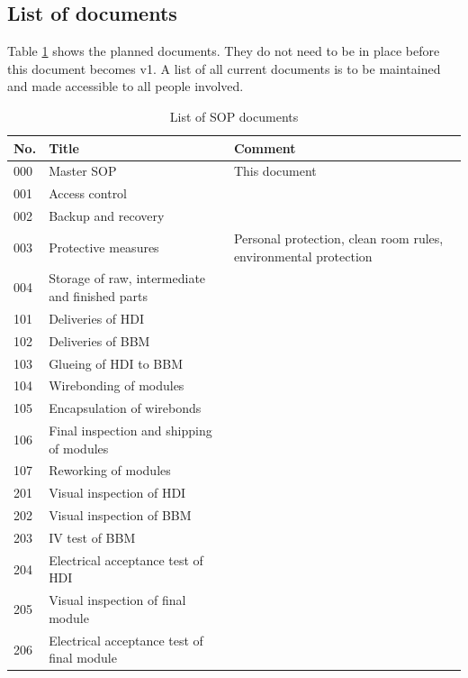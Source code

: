 \documentclass[12pt]{unlsilabsop}
\begin{document}
\subsection{List of documents}
Table \ref{tbl:SOPlist} shows the planned documents. They do not need to be in place before this document becomes v1. A list of all current documents is to be maintained and made accessible to all people involved.

\begin{table}[hH]
\begin{center}
\caption{List of SOP documents}
\label{tbl:SOPlist}

\bigskip

{\footnotesize
\begin{tabular}{lp{7cm}p{6cm}}
\toprule
No. & Title & Comment \\
\midrule
000 & Master SOP & This document \\
\midrule
001 & Access control & \\
002 & Backup and recovery & \\
003 & Protective measures & Personal protection, clean room rules, environmental protection \\
004 & Storage of raw, intermediate and finished parts & \\
\midrule
101 & Deliveries of HDI & \\
102 & Deliveries of BBM & \\
103 & Glueing of HDI to BBM & \\
104 & Wirebonding of modules & \\
105 & Encapsulation of wirebonds & \\
106 & Final inspection and shipping of modules & \\
107 & Reworking of modules & \\
\midrule
201 & Visual inspection of HDI & \\
202 & Visual inspection of BBM & \\
203 & IV test of BBM & \\
204 & Electrical acceptance test of HDI & \\
205 & Visual inspection of final module & \\
206 & Electrical acceptance test of final module & \\

\end{tabular}}
\end{center}
\end{table}
\end{document}
